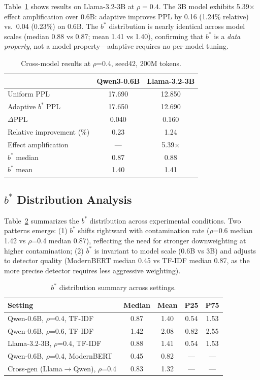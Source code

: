 \documentclass[11pt]{article}
\begin{document}
Table~\ref{tab:cross_model} shows results on Llama-3.2-3B at $\rho=0.4$. The 3B model exhibits 5.39$\times$ effect amplification over 0.6B: adaptive improves PPL by 0.16 (1.24\% relative) vs.\ 0.04 (0.23\%) on 0.6B. The $b^*$ distribution is nearly identical across model scales (median 0.88 vs 0.87; mean 1.41 vs 1.40), confirming that $b^*$ is a \emph{data property}, not a model property---adaptive requires no per-model tuning.

\begin{table}[t]
\centering
\caption{Cross-model results at $\rho$=0.4, seed42, 200M tokens.}
\label{tab:cross_model}
\small
\begin{tabular}{l cc}
\toprule
& Qwen3-0.6B & Llama-3.2-3B \\
\midrule
Uniform PPL & 17.690 & 12.850 \\
Adaptive $b^*$ PPL & 17.650 & 12.690 \\
$\Delta$PPL & 0.040 & 0.160 \\
Relative improvement (\%) & 0.23 & 1.24 \\
Effect amplification & --- & 5.39$\times$ \\
\midrule
$b^*$ median & 0.87 & 0.88 \\
$b^*$ mean & 1.40 & 1.41 \\
\bottomrule
\end{tabular}
\end{table}

\subsection{$b^*$ Distribution Analysis}
\label{sec:bstar_dist}

Table~\ref{tab:bstar_dist} summarizes the $b^*$ distribution across experimental conditions. Two patterns emerge: (1) $b^*$ shifts rightward with contamination rate ($\rho$=0.6 median 1.42 vs $\rho$=0.4 median 0.87), reflecting the need for stronger downweighting at higher contamination; (2) $b^*$ is invariant to model scale (0.6B vs 3B) and adjusts to detector quality (ModernBERT median 0.45 vs TF-IDF median 0.87, as the more precise detector requires less aggressive weighting).

\begin{table}[t]
\centering
\caption{$b^*$ distribution summary across settings.}
\label{tab:bstar_dist}
\small
\begin{tabular}{l cccc}
\toprule
Setting & Median & Mean & P25 & P75 \\
\midrule
Qwen-0.6B, $\rho$=0.4, TF-IDF & 0.87 & 1.40 & 0.54 & 1.53 \\
Qwen-0.6B, $\rho$=0.6, TF-IDF & 1.42 & 2.08 & 0.82 & 2.55 \\
Llama-3.2-3B, $\rho$=0.4, TF-IDF & 0.88 & 1.41 & 0.54 & 1.53 \\
Qwen-0.6B, $\rho$=0.4, ModernBERT & 0.45 & 0.82 & --- & --- \\
Cross-gen (Llama$\to$Qwen), $\rho$=0.4 & 0.83 & 1.32 & --- & --- \\
\bottomrule
\end{tabular}
\end{table}
\end{document}
